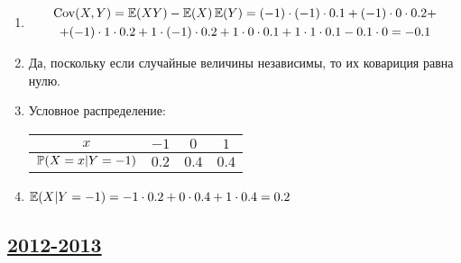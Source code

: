 \begin{enumerate}
\begin{enumerate}
\item
\begin{multline*}
\Cov(X, Y) = \E(XY) - \E(X) \E(Y)  = (-1)\cdot (-1) \cdot 0.1 + (-1) \cdot 0 \cdot 0.2 + \\
+ (-1) \cdot 1 \cdot 0.2 + 1 \cdot (-1) \cdot 0.2 + 1 \cdot 0 \cdot 0.1 + 1 \cdot 1 \cdot 0.1 -
0.1 \cdot 0 = -0.1
\end{multline*}
\item Да, поскольку если случайные величины независимы, то их ковариция равна нулю.
\item Условное распределение:
\begin{center}
\begin{tabular}{@{}cccc@{}}
\toprule
$x$    & $-1$  & $0$   & $1$   \\ \midrule
$\P(X = x |Y=-1)$ & $0.2$ & $0.4$ & $0.4$ \\ \bottomrule
\end{tabular}
\end{center}
\item $\E(X | Y = -1) = -1 \cdot 0.2 + 0 \cdot 0.4 + 1 \cdot 0.4 = 0.2$
\end{enumerate}
\end{enumerate}




\subsection[2012-2013]{\hyperref[sec:kr_01_2012_2013]{2012-2013}}
\label{sec:sol_kr_01_2012_2013}


